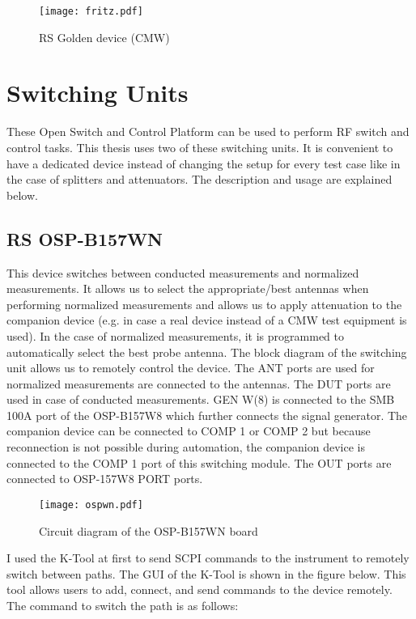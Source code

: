 \begin{figure}[H]
\centering
\texttt{[image: fritz.pdf]}
\caption{\acs{RS}\textregistered{} Golden device (\acs{CMW})}
\label{fig:cmwGUI}
\end{figure}

\section{Switching Units}
These Open Switch and Control Platform can be used to perform \acs{RF} switch and control tasks. This thesis uses two of these switching units. It is convenient to have a dedicated device instead of changing the setup for every test case like in the case of splitters and attenuators. The description and usage are explained below.

\subsection{\acs{RS}\textregistered{} \ac{OSP}-B157WN} \label{sec:wn}
This device switches between conducted measurements and normalized measurements. It allows us to select the appropriate/best antennas when performing normalized measurements and allows us to apply attenuation to the companion device (e.g. in case a real device instead of a \acs{CMW} test equipment is used). In the case of normalized measurements, it is programmed to automatically select the best probe antenna. The block diagram of the switching unit allows us to remotely control the device. The ANT ports are used for normalized measurements are connected to the antennas. The \acs{DUT} ports are used in case of conducted measurements. GEN W(8) is connected to the SMB 100A port of the \acs{OSP}-B157W8 which further connects the signal generator. The companion device can be connected to COMP 1 or COMP 2 but because reconnection is not possible during automation, the companion device is connected to the COMP 1 port of this switching module. The OUT ports are connected to \acs{OSP}-157W8 PORT ports.

\begin{figure}[H]
\centering
\texttt{[image: ospwn.pdf]}
\caption{Circuit diagram of the \acs{OSP}-B157WN board}
\label{fig:ospwn}
\end{figure}

I used the K-Tool at first to send \acs{SCPI} commands to the instrument to remotely switch between paths. The \acs{GUI} of the K-Tool is shown in the figure below. This tool allows users to add, connect, and send commands to the device remotely. The command to switch the path is as follows: 

